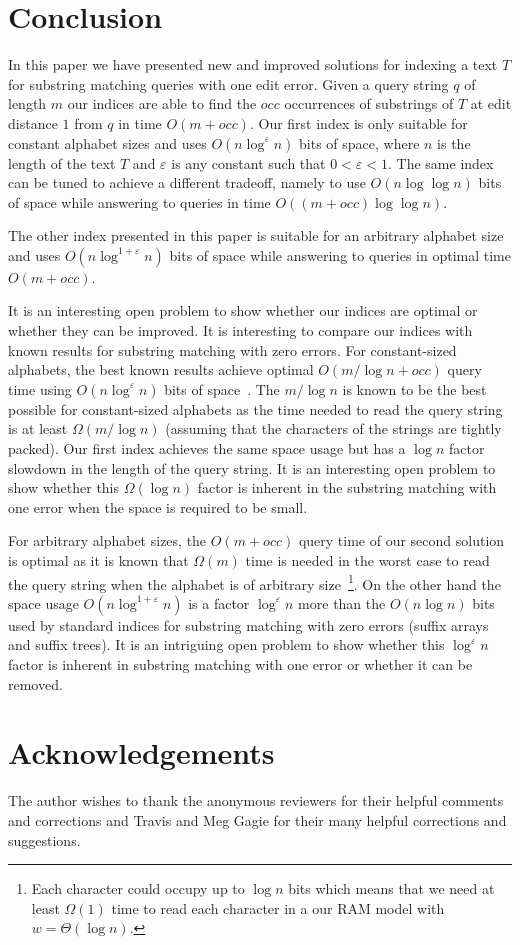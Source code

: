 \documentclass{article}
\newcommand{\?}{\mskip1.5mu}
\renewcommand{\epsilon}{\varepsilon}
\begin{document}
\section{Conclusion}
\label{section:conclusion}
In this paper we have presented new and improved solutions for indexing a text $T$ for substring matching queries with one edit error. 
Given a query string $q$ of length $m$ our indices are able to find the $occ$ occurrences of substrings of $T$ at edit distance $1$ from $q$ in time $O(m+occ)$. Our first index is only suitable for constant alphabet sizes and uses $O(n\log^\epsilon n)$  bits of space, where $n$ is the length of the text $T$ and $\epsilon$ is any constant such that $0<\epsilon<1$. The same index can be tuned to achieve a different tradeoff, namely to use $O(n\log\log n)$ bits of space while answering to queries in time $O((m+occ)\log\log n)$. 

The other index presented in this paper is suitable for an arbitrary alphabet size and uses $O(n\log^{1+\epsilon} n)$ bits of space while answering to queries in optimal time $O(m+occ)$. 

It is an interesting open problem to show whether our indices are optimal or whether they can be improved. It is interesting to compare our indices with known results for substring matching with zero errors. For constant-sized alphabets, the best known results achieve  optimal $O(m/\log n+occ)$ query time using $O(n\log^\epsilon n)$ bits of space~\cite{GV05}. The $m/\log n$ is known to be the best possible for constant-sized alphabets as the time needed to read the query string is at least $\Omega(m/\log n)$ (assuming that the characters of the strings are tightly packed). Our first index achieves the same space usage but has a $\log n$ factor slowdown in the length of the query string. It is an interesting open problem to show whether this $\Omega(\log n)$ factor is inherent in the substring matching with one error when the space is required to be small. 

For arbitrary alphabet sizes, the $O(m+occ)$ query time of our second solution is optimal as it is known that $\Omega(m)$ time is needed in the worst case to read the query string when the alphabet is of arbitrary size~\footnote{Each character could occupy up to $\log n$ bits which means that we need at least $\Omega(1)$ time to read each character in a our RAM model with $w=\Theta(\log n)$.}. On the other hand the space usage $O(n\log^{1+\epsilon} n)$ is a factor $\log^\epsilon n$ more than the $O(n\log n)$ bits used by standard indices for substring matching with zero errors (suffix arrays and suffix trees). It is an intriguing open problem to show whether this $\log^\epsilon n$ factor is inherent in substring matching with one error or whether it can be removed. 

\section*{Acknowledgements}
The author wishes to thank the anonymous reviewers for their helpful comments and corrections
and Travis and Meg Gagie for their many helpful corrections and suggestions. 


\small 
 
\normalsize

\newpage
\end{document}
